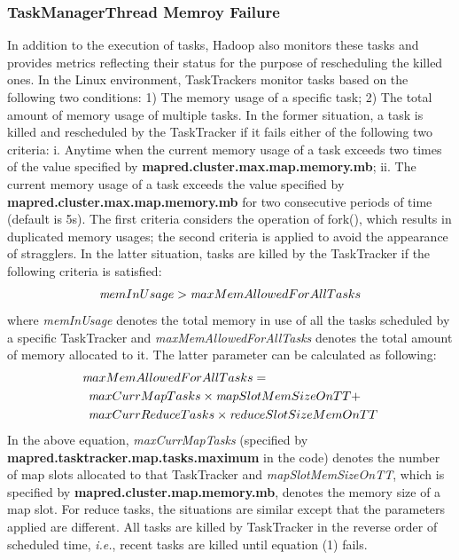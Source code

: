 \subsubsection{TaskManagerThread Memroy Failure}
In addition to the execution of tasks, Hadoop also monitors these tasks and provides metrics reflecting their status for the purpose of rescheduling the killed ones.
In the Linux environment, TaskTrackers monitor tasks based on the following two conditions:  1) The memory usage of a specific task; 2) The total amount of memory usage of multiple tasks.
In the former situation, a task is killed and rescheduled by the TaskTracker if it fails either of the following two criteria:
i. Anytime when the current memory usage of a task exceeds two times of the value specified by {\bf mapred.cluster.max.map.memory.mb};
ii. The current memory usage of a task exceeds the value specified by {\bf mapred.cluster.max.map.memory.mb} for two consecutive periods of time (default is 5s). 
The first criteria considers the operation of fork(), which results in duplicated memory usages; the second criteria is applied to avoid the appearance of stragglers.
In the latter situation, tasks are killed by the TaskTracker if the following criteria is satisfied:
\begin{equation}
{\emph memInUsage} > {\emph maxMemAllowedForAllTasks} 
\end{equation}
where \emph {memInUsage} denotes the total memory in use of all the tasks scheduled by a specific TaskTracker and \emph {maxMemAllowedForAllTasks} denotes the total amount of memory allocated to it. The latter parameter can be calculated as following:
\begin{equation*}
\begin{aligned}
&{\emph maxMemAllowedForAllTasks} = \\
& \hspace {5pt} {\emph maxCurrMapTasks} \times {\emph mapSlotMemSizeOnTT} + \\
& \hspace {5pt} {\emph maxCurrReduceTasks} \times {\emph reduceSlotSizeMemOnTT}
\end{aligned}
\end{equation*}
In the above equation, \emph {maxCurrMapTasks} (specified by {\bf mapred.tasktracker.map.tasks.maximum} in the code) denotes the number of map slots allocated to that TaskTracker and \emph {mapSlotMemSizeOnTT}, which is specified by {\bf mapred.cluster.map.memory.mb}, denotes the memory size of a map slot. 
For reduce tasks, the situations are similar except that the parameters applied are different.
All tasks are killed by TaskTracker in the reverse order of scheduled time, \emph{i.e.}, recent tasks are killed until equation (1) fails. 
\par

